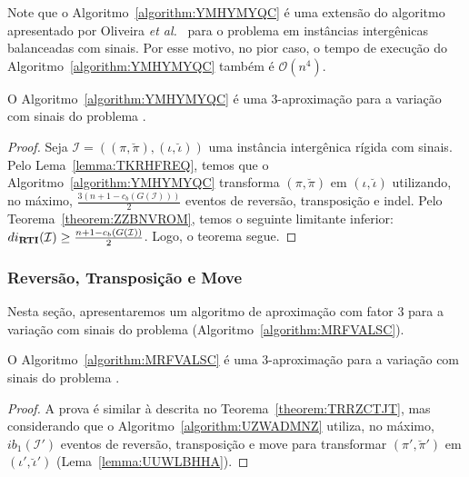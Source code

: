 Note que o Algoritmo~\ref{algorithm:YMHYMYQC} é uma extensão do algoritmo apresentado por Oliveira \textit{et al.}~\cite{2021a-oliveira-etal} para o problema \SbIRT{} em instâncias intergênicas balanceadas com sinais. Por esse motivo, no pior caso, o tempo de execução do Algoritmo~\ref{algorithm:YMHYMYQC} também é $\mathcal{O}(n^4)$.

\begin{theorem}\label{theorem:VPNTPEUI}
O Algoritmo~\ref{algorithm:YMHYMYQC} é uma $3$-aproximação para a variação com sinais do problema \SbIRTI{}.
\end{theorem}
\begin{proof}
Seja $\mathcal{I} = ((\pi,\breve\pi),(\iota,\breve\iota))$ uma instância intergênica rígida com sinais. Pelo Lema~\ref{lemma:TKRHFREQ}, temos que o Algoritmo~\ref{algorithm:YMHYMYQC} transforma $(\pi,\breve\pi)$ em $(\iota,\breve\iota)$ utilizando, no máximo, $\frac{3(n+1 - c_b(G(\mathcal{I})))}{2}$ eventos de reversão, transposição e indel. Pelo Teorema~\ref{theorem:ZZBNVROM}, temos o seguinte limitante inferior: $di_{\textbf{RTI}}(\mathcal{I}) \ge\frac{{n + 1} - c_b(G(\mathcal{I}))}{2}$. Logo, o teorema segue.
\end{proof}

\subsubsection{Reversão, Transposição e Move}

Nesta seção, apresentaremos um algoritmo de aproximação com fator $3$ para a variação com sinais do problema \SbIRTM{} (Algoritmo~\ref{algorithm:MRFVALSC}).



\begin{theorem}\label{theorem:SIMBVUPO}
O Algoritmo~\ref{algorithm:MRFVALSC} é uma $3$-aproximação para a variação com sinais do problema \SbIRTM{}.
\end{theorem}
\begin{proof}
A prova é similar à descrita no Teorema~\ref{theorem:TRRZCTJT}, mas considerando que o Algoritmo~\ref{algorithm:UZWADMNZ} utiliza, no máximo, $ib_1(\mathcal{I'})$ eventos de reversão, transposição e move para transformar $(\pi',\breve\pi')$ em $(\iota',\breve\iota')$ (Lema~\ref{lemma:UUWLBHHA}).
\end{proof}

